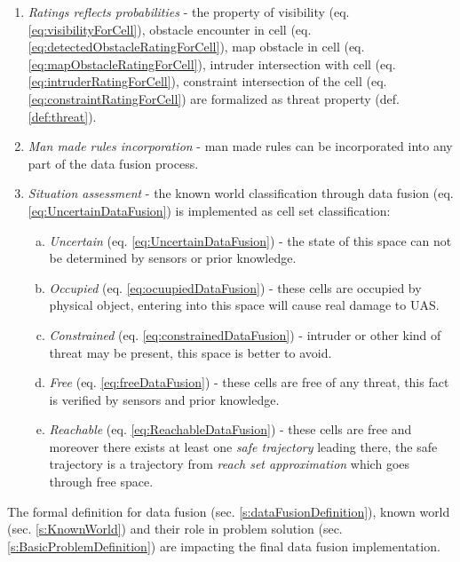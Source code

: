 \begin{enumerate}
        \item \emph{Ratings reflects probabilities} - the property of visibility (eq. \ref{eq:visibilityForCell}), obstacle encounter in cell (eq. \ref{eq:detectedObstacleRatingForCell}), map obstacle in cell (eq. \ref{eq:mapObstacleRatingForCell}), intruder intersection with cell (eq. \ref{eq:intruderRatingForCell}), constraint intersection of the cell (eq. \ref{eq:constraintRatingForCell}) are formalized as threat property (def. \ref{def:threat}). 
	    
	    \item \emph{Man made rules incorporation} - man made rules can be incorporated into any part of the data fusion process.
	    
	    \item \emph{Situation assessment} - the known world classification through data fusion (eq. \ref{eq:UncertainDataFusion}) is implemented as cell set classification:
	    \begin{enumerate}[a.]
	        \item \emph{Uncertain} (eq. \ref{eq:UncertainDataFusion}) - the state of this space can not be determined by sensors or prior knowledge.
	        
	        \item \emph{Occupied} (eq. \ref{eq:ocuupiedDataFusion}) -  these cells are occupied by physical object, entering into this space will cause real damage to UAS.
	        
 	        \item \emph{Constrained} (eq. \ref{eq:constrainedDataFusion}) - intruder or other kind of threat may be present, this space is better to avoid.
 	        
	        \item \emph{Free} (eq. \ref{eq:freeDataFusion}) - these cells are free of any threat, this fact is verified by sensors and prior knowledge.
	        
	        \item \emph{Reachable} (eq. \ref{eq:ReachableDataFusion}) - these cells are free and moreover there exists at least one \emph{safe trajectory} leading there, the safe trajectory is a trajectory from \emph{reach set approximation} which goes through free space.
	    \end{enumerate}
\end{enumerate}	    

\begin{note}
    The formal definition for data fusion (sec. \ref{s:dataFusionDefinition}), known world (sec. \ref{s:KnownWorld}) and their role in problem solution (sec. \ref{s:BasicProblemDefinition}) are impacting the final data fusion implementation.
\end{note}
